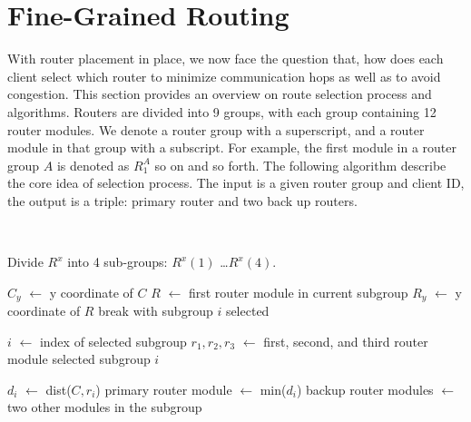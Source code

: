 \section{Fine-Grained Routing}


With router placement in place, we now face the question that, how does each
client select which router to minimize communication hops as well as to avoid
congestion. This section provides an overview on route selection process and
algorithms. Routers are divided into 9 groups, with each group containing 12
router modules. We denote a router group with a superscript, and a router
module in that group with a subscript. For example, the first module in a
router group $A$ is denoted as $R^A_1$ so on and so forth. The following
algorithm describe the core idea of selection process. The input is a given
router group and client ID, the output is a triple: primary router and two back
up routers.

\begin{algorithmic}[1]
 \\ \hrulefill

\State Divide $R^x$ into 4 sub-groups: $R^x(1)$ \ldots $R^x(4)$.

    \State $C_y$ $\leftarrow$ y coordinate of $C$
    \State $R$ $\leftarrow$ first router module in current subgroup
    \State $R_y$ $\leftarrow$ y coordinate of $R$
    \State break with subgroup $i$ selected
    \EndIf
\EndFor

\State $i$ $\leftarrow$ index of selected subgroup
\State $r_1, r_2, r_3$ $\leftarrow$ first, second, and third router module 
\State \hspace{\algorithmicindent} selected subgroup $i$

    \State $d_i$ $\leftarrow$ dist($C, r_i$) 
    \State primary router module $\leftarrow$ min($d_i$)
    \State backup router modules $\leftarrow$ 
     two other modules in the subgroup 
\EndFor

\EndProcedure
\\\hrulefill
\end{algorithmic}





